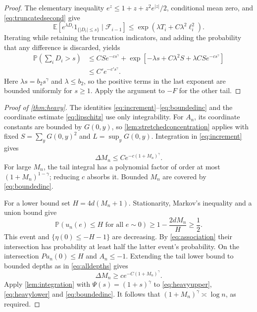 \documentclass[11pt]{amsart}
\theoremstyle{remark}
\newcommand{\Pp}{\mathbb P}
\newcommand{\E}{\mathbb E}
\newcommand{\ind}{\mathrm{1}}
\begin{document}
\begin{proof}
The elementary inequality $e^z\le1+z+z^2e^{|z|}/2$, conditional mean
zero, and \eqref{eq:truncatedsecond} give
\[
 \E[e^{\lambda D_i}\ind_{\{|D_i|\le s\}}
           \mid\mathcal F_{i-1}]
 \le\exp(\lambda T_i+C\lambda^2\ell_i^2).
\]
Iterating while retaining the truncation indicators, and adding the
probability that any difference is discarded, yields
\begin{align*}
 \Pp\left(\sum_iD_i>s\right)
 &\le CS e^{-cs^\gamma}
  +\exp\left[-\lambda s+C\lambda^2S+\lambda CS e^{-cs^\gamma}\right]\\
 &\le C'e^{-c's^\gamma}.
\end{align*}
Here $\lambda s=b_2s^\gamma$ and $\lambda\le b_2$, so the positive
terms in the last exponent are bounded uniformly for $s\ge1$.
Apply the argument to $-F$ for the other tail.
\end{proof}

\begin{proof}[Proof of \cref{thm:heavy}]
The identities \eqref{eq:increment}--\eqref{eq:boundedinc} and the
coordinate estimate \eqref{eq:lipschitz} use only integrability.
For $A_n$, its coordinate constants are bounded by $G(0,y)$, so
\cref{lem:stretchedconcentration} applies with fixed
$S=\sum_yG(0,y)^2$ and $L=\sup_yG(0,y)$.
Integration in \eqref{eq:increment} gives
\begin{equation}\label{eq:heavyupper}
 \Delta M_n\le C e^{-c(1+M_n)^\gamma}.
\end{equation}
For large $M_n$, the tail integral has a polynomial factor of order at
most $(1+M_n)^{1-\gamma}$; reducing $c$ absorbs it. Bounded $M_n$ are
covered by \eqref{eq:boundedinc}.

For a lower bound set $H=4d(M_n+1)$. Stationarity, Markov's inequality
and a union bound give
\[
 \Pp(u_n(e)\le H\text{ for all }e\sim0)
 \ge1-\frac{2dM_n}{H}\ge\frac12.
\]
This event and $\{\eta(0)\le-H-1\}$ are decreasing. By
\eqref{eq:association} their intersection has probability at least half
the latter event's probability. On the intersection $Pu_n(0)\le H$ and
$A_n\le-1$. Extending the tail lower bound to bounded depths as in
\eqref{eq:alldepths} gives
\begin{equation}\label{eq:heavylower}
 \Delta M_n\ge c e^{-C(1+M_n)^\gamma}.
\end{equation}
Apply \cref{lem:integration} with $\Psi(s)=(1+s)^\gamma$ to
\eqref{eq:heavyupper}, \eqref{eq:heavylower} and
\eqref{eq:boundedinc}. It follows that
$(1+M_n)^\gamma\asymp\log n$, as required.
\end{proof}
\end{document}
